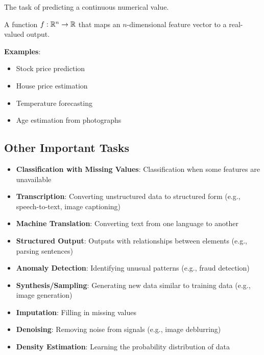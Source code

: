 The task of predicting a continuous numerical value.

\begin{definitionbox}[Regression]
A function $f: \mathbb{R}^n \rightarrow \mathbb{R}$ that maps an $n$-dimensional feature vector to a real-valued output.
\end{definitionbox}

\textbf{Examples}:
\begin{itemize}
    \item Stock price prediction
    \item House price estimation
    \item Temperature forecasting
    \item Age estimation from photographs
\end{itemize}

\subsection{Other Important Tasks}

\begin{itemize}
    \item \textbf{Classification with Missing Values}: Classification when some features are unavailable
    \item \textbf{Transcription}: Converting unstructured data to structured form (e.g., speech-to-text, image captioning)
    \item \textbf{Machine Translation}: Converting text from one language to another
    \item \textbf{Structured Output}: Outputs with relationships between elements (e.g., parsing sentences)
    \item \textbf{Anomaly Detection}: Identifying unusual patterns (e.g., fraud detection)
    \item \textbf{Synthesis/Sampling}: Generating new data similar to training data (e.g., image generation)
    \item \textbf{Imputation}: Filling in missing values
    \item \textbf{Denoising}: Removing noise from signals (e.g., image deblurring)
    \item \textbf{Density Estimation}: Learning the probability distribution of data
\end{itemize}


